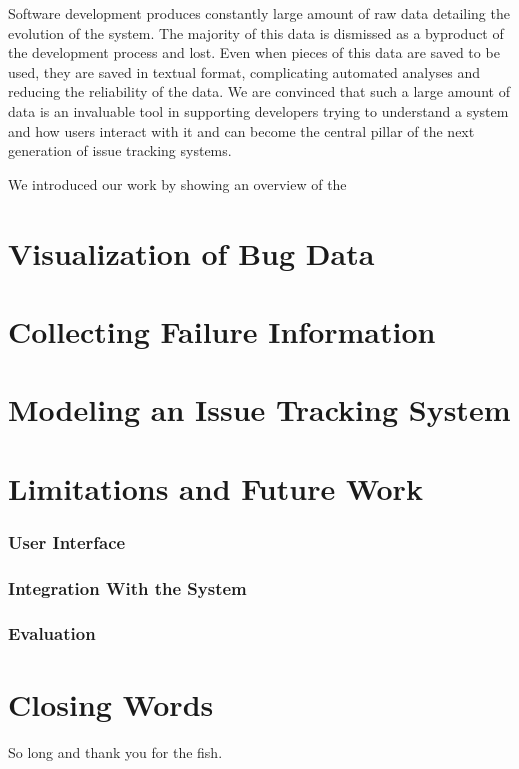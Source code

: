


Software development produces constantly large amount of raw data detailing the evolution of the system.
The majority of this data is dismissed as a byproduct of the development process and lost.
Even when pieces of this data are saved to be used, they are saved in textual format, complicating automated analyses and reducing the reliability of the data.
We are convinced that such a large amount of data is an invaluable tool in supporting developers trying to understand a system and how users interact with it and can become the central pillar of the next generation of issue tracking systems.

We introduced our work by showing an overview of the


\section{Visualization of Bug Data}

\section{Collecting Failure Information}

\section{Modeling an Issue Tracking System}


\section{Limitations and Future Work}

\subsubsection{User Interface}

\subsubsection{Integration With the System}

\subsubsection{Evaluation}


\section{Closing Words}
So long and thank you for the fish.

